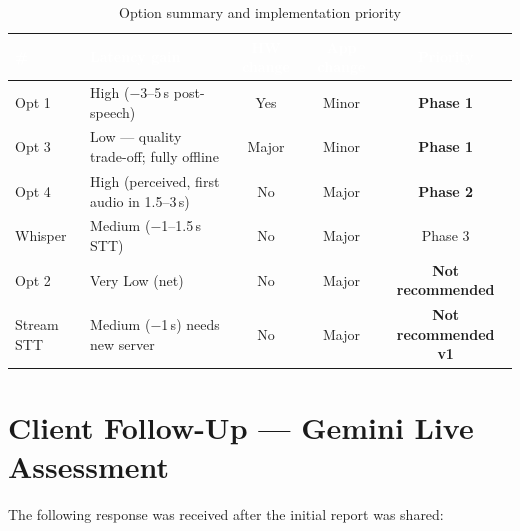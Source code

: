 \documentclass[12pt,a4paper]{article}
\begin{document}
\begin{table}[h!]
\centering
\renewcommand{\arraystretch}{1.5}
\begin{tabularx}{\linewidth}{|l|X|c|c|c|}
\hline
\rowcolor{primary}
\textcolor{white}{\textbf{\#}} &
\textcolor{white}{\textbf{Latency gain}} &
\textcolor{white}{\textbf{HW change}} &
\textcolor{white}{\textbf{App change}} &
\textcolor{white}{\textbf{Priority}} \\
\hline
Opt 1 & High ($-$3--5\,s post-speech) & Yes & Minor & \textbf{Phase 1} \\
\hline
\rowcolor{rowalt}
Opt 3 & Low — quality trade-off; fully offline & Major & Minor & \textbf{Phase 1} \\
\hline
Opt 4 & High (perceived, first audio in 1.5--3\,s) & No & Major & \textbf{Phase 2} \\
\hline
\rowcolor{rowalt}
Whisper & Medium ($-$1--1.5\,s STT) & No & Major & Phase 3 \\
\hline
Opt 2 & Very Low (net) & No & Major & \textbf{Not recommended} \\
\hline
\rowcolor{rowalt}
Stream STT & Medium ($-$1\,s) needs new server & No & Major & \textbf{Not recommended v1} \\
\hline
\end{tabularx}
\caption{Option summary and implementation priority}
\end{table}

\section{Client Follow-Up — Gemini Live Assessment}

The following response was received after the initial report was shared:
\end{document}
